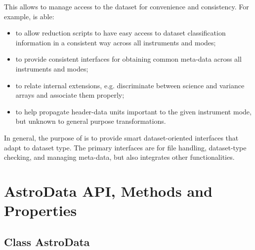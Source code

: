 \documentclass[letterpaper,10pt,english]{sphinxmanual}
\begin{document}
This allows  to manage access to the dataset for convenience
and consistency. For example,  is able:
\begin{itemize}
\item {} 
to allow reduction scripts to have easy access to dataset classification
information in a consistent way across all instruments and modes;

\item {} 
to provide consistent interfaces for obtaining common meta-data across all
instruments and modes;

\item {} 
to relate internal extensions, e.g. discriminate between science and
variance arrays and associate them properly;

\item {} 
to help propagate header-data units important to the given instrument mode,
but unknown to general purpose transformations.

\end{itemize}

In general, the purpose of  is to provide smart dataset-oriented
interfaces that adapt to dataset type. The primary interfaces are for file
handling, dataset-type checking, and managing meta-data, but 
also integrates other functionalities.


\chapter{AstroData API, Methods and Properties}
\label{astro_class:astrodata-api-methods-and-properties}\label{astro_class::doc}

\section{Class AstroData}
\label{astro_class:class-astrodata}\label{astro_class:module-astrodata.AstroData}
\end{document}
